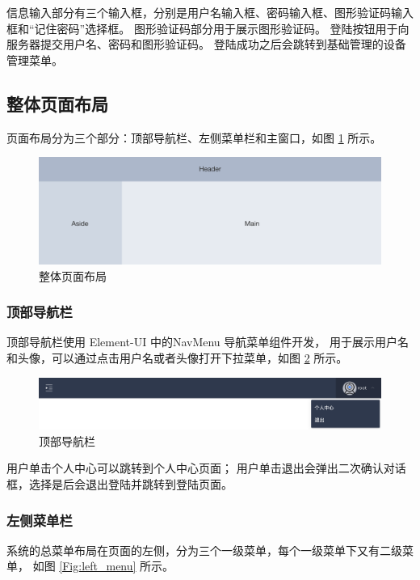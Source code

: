 信息输入部分有三个输入框，分别是用户名输入框、密码输入框、图形验证码输入框和“记住密码”选择框。
图形验证码部分用于展示图形验证码。
登陆按钮用于向服务器提交用户名、密码和图形验证码。
登陆成功之后会跳转到基础管理的设备管理菜单。

\subsection{整体页面布局}
页面布局分为三个部分：顶部导航栏、左侧菜单栏和主窗口，如图 \ref{Fig:layout} 所示。

\begin{figure}[ht]
    \centering
    \includegraphics[width=1\linewidth]{./Figure/IMG_layout.png}
    \caption{整体页面布局}\label{Fig:layout}
\end{figure}

\subsubsection{顶部导航栏}
顶部导航栏使用 Element-UI 中的NavMenu 导航菜单组件开发，
用于展示用户名和头像，可以通过点击用户名或者头像打开下拉菜单，如图 \ref{Fig:top} 所示。

\begin{figure}[ht]
    \centering
    \includegraphics[width=1\linewidth]{./Figure/IMG_top.png}
    \caption{顶部导航栏}\label{Fig:top}
\end{figure}

用户单击个人中心可以跳转到个人中心页面；
用户单击退出会弹出二次确认对话框，选择是后会退出登陆并跳转到登陆页面。

\newpage
\subsubsection{左侧菜单栏}
系统的总菜单布局在页面的左侧，分为三个一级菜单，每个一级菜单下又有二级菜单，
如图 \ref{Fig:left_menu} 所示。


